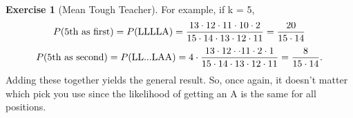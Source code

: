 \documentclass[10pt,]{book}
\theoremstyle{plain}
\theoremstyle{definition}
\theoremstyle{definition}
\theoremstyle{definition}
\newtheorem{exercise}[theorem]{Exercise}
\numberwithin{equation}{section}
\begin{document}
\begin{exercise}[{Mean Tough Teacher}]
	For example, if k = 5,
	\begin{equation*} P(\text{5th as first}) = P(\text{LLLLA}) \\ = \frac{13 \cdot 12 \cdot 11 \cdot 10  \cdot 2}{15 \cdot 14 \cdot 13 \cdot 12 \cdot 11} = \frac{20}{15 \cdot 14}\end{equation*}
	\begin{equation*} P(\text{5th as second}) = P(\text{LL...LAA}) \\ = 4 \cdot \frac{13 \cdot 12 \cdot \cdot 11 \cdot 2 \cdot 1}{15 \cdot 14 \cdot 13 \cdot 12 \cdot 11} \\ = \frac{8}{15 \cdot 14}.\end{equation*}	
	Adding these together yields the general result. So, once again, it doesn't matter which pick you use since the likelihood of getting an A is the same for all positions.
\end{exercise}
\end{document}
